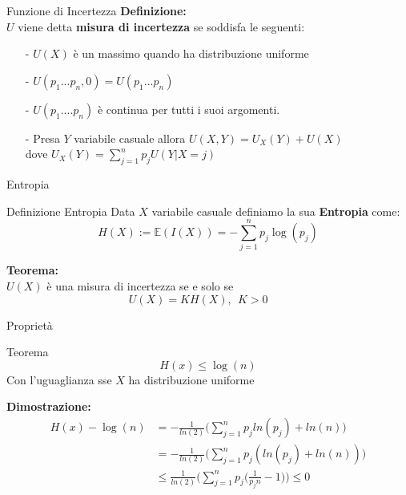 \documentclass{beamer}
\newtheorem{teo}{Teorema}[section]
\theoremstyle{definition}
\numberwithin{equation}{section}
\newcommand{\sumj}{\sum_{j=1}^n}
\begin{document}
\begin{frame}[t]{Funzione di Incertezza}
\large \textbf{Definizione:}\\
$U$ viene detta \textbf{misura di incertezza} se soddisfa le seguenti:
\begin{enumerate}
\item[-] $U(X)$ è un massimo quando ha distribuzione uniforme
\vspace{9pt}
\item[-] $U(p_1...p_n,0)=U(p_1...p_n)$
\vspace{9pt}
\item[-] $U(p_1....p_n)$ è continua per tutti i suoi argomenti.
\vspace{9pt}
\item[-] Presa $Y$ variabile casuale allora $U(X,Y)=U_X(Y)+U(X)$\\
 dove $U_X(Y)= \sumj p_j U(Y|X=j)$
\end{enumerate}
\end{frame}


\begin{frame}[t]{Entropia} \vspace{5pt}
\begin{block}{Definizione Entropia}
\vspace{0.5em}
Data $X$ variabile casuale definiamo la sua \textbf{Entropia} come:
\begin{equation*}
H(X):=\mathbb{E}(I(X))=-\sum_{j=1}^np_j\log(p_j)
\end{equation*}
\vspace{0.5em}
\end{block}
\vspace{20pt}
\large \textbf{Teorema:}\\
$U(X)$ è una misura di incertezza se e solo se 
$$U(X)= KH(X) , \ \ K>0 \ \ \ \ \ \ \ \ $$
\vspace{15pt}
\end{frame}


\begin{frame}[t]{Proprietà} \vspace{5pt}
\begin{block}{Teorema}
\begin{equation*}
H(x) \leq \log(n)
\end{equation*}
Con l'uguaglianza sse $X$ ha distribuzione uniforme
\end{block}
\large\textbf{Dimostrazione:}\\
\[
\begin{split}
H(x)-\log{(n)}
&=-\frac{1}{ln(2)} \bigg( \sumj p_j ln (p_j) + ln(n) \bigg)\\
&=-\frac{1}{ln(2)} \bigg( \sumj p_j (ln (p_j) + ln(n)) \bigg)\\
&\leq \frac{1}{ln(2)} \bigg( \sumj p_j \bigg( \frac{1}{p_jn} -1 \bigg) \bigg)\leq 0
\end{split}
\]
\vspace{30pt}
\end{frame}
\end{document}
